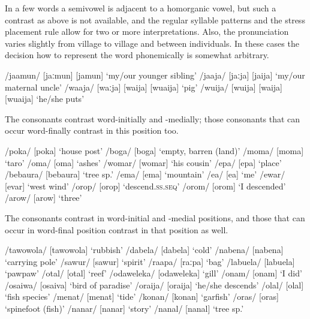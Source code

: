 In a few words a semivowel is adjacent to a homorganic vowel, but such a contrast as above is not available, and the regular syllable patterns and the stress placement rule allow for two or more interpretations. Also, the pronunciation varies slightly from village to village and between individuals.  In these cases the decision how to represent the word phonemically is somewhat arbitrary.

\ea
\ea
/jaamun/  [{{\textprimstress}jaːmun}] {\Tilde} [j{\textsci{{\textprimstress}}}amun]  `my/our younger sibling'
\ex
/jaaja/  [{{\textprimstress}jaːja}] {\Tilde} [{{\textprimstress}jaija}]  `my/our maternal uncle'
\ex
/waaja/  [{{\textprimstress}waːja}] {\Tilde} [{{\textprimstress}waija}] {\Tilde} [{{\textprimstress}wuaija}]  `pig'
\ex
/wuija/  [{{\textprimstress}wuija}] {\Tilde} [{{\textprimstress}waija}] {\Tilde} [{{\textprimstress}wuaija}]  `he/she puts'
\z
\z

The  consonants contrast word-initially and -medially; those consonants that can occur word-finally contrast in this position too. 

\ea
\ea
/poka/  [po{{\textprimstress}ka}]  `house post'
\ex
/boga/  [bo{{\textprimstress}ga}]  `empty, barren (land)'
\ex
/moma/  [mo{{\textprimstress}ma}]  `taro'
\ex
/{\textphi}oma/  [{\textphi}o{{\textprimstress}ma}]  `ashes'
\ex
/womar/  [wo{{\textprimstress}mar}]  `his cousin'
\ex
/epa/  [e{{\textprimstress}pa}]  `place'
\ex
/bebaura/  [be{{\textprimstress}baura}]  `tree sp.'
\ex
/ema/  [e{{\textprimstress}ma}]  `mountain'
\ex
/e{\textphi}a/  [e{{\textprimstress}}{\textphi}a]  `me'
\ex
/ewar/  [e{{\textprimstress}var}]  `west wind'
\ex
/orop/  [o{{\textprimstress}rop}]  `descend.\textsc{ss.seq}'
\ex
/orom/  [o{{\textprimstress}rom}]  `I descended'
\ex
/arow/  [a{{\textprimstress}row}]  `three'
\z
\z


The  consonants contrast in word-initial and -medial positions, and those that can occur in word-final position contrast in that position as well.

\ea
\ea
/tawowola/  [ta{{\textprimstress}wowola}]  `rubbish'
\ex
/dabela/  [da{{\textprimstress}bela}]  `cold'
\ex
/nabena/  [na{{\textprimstress}bena}]  `carrying pole'
\ex
/sawur/  [sa{{\textprimstress}wur}]  `spirit'    
\ex
/raapa/  [{{\textprimstress}raːpa}]  `bag'
\ex
/labuela/  [la{{\textprimstress}buela}]  `pawpaw'
\ex
/otal/  [o{{\textprimstress}tal}]  `reef'
\ex
/odaweleka/  [o{{\textprimstress}daweleka}]  `gill'
\ex
/onam/  [o{{\textprimstress}nam}]  `I did'
\ex
/osaiwa/  [o{{\textprimstress}saiva}]  `bird of paradise'
\ex
/oraija/  [o{{\textprimstress}raija}]  `he/she descends'
\ex
/olal/  [o{{\textprimstress}lal}]  `fish species'
\ex
/menat/  [me{{\textprimstress}nat}]  `tide'
\ex
/konan/  [ko{{\textprimstress}nan}]  `garfish'
\ex
/oras/  [o{{\textprimstress}ras}]  `spinefoot (fish)'
\ex
/nanar/  [na{{\textprimstress}nar}]  `story'
\ex
/nanal/  [na{{\textprimstress}nal}]  `tree sp.'
\z
\z

